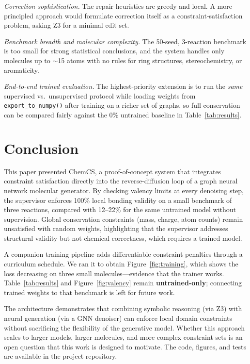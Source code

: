 \documentclass[11pt]{article}
\begin{document}
\emph{Correction sophistication.} The repair heuristics are greedy and
local. A more principled approach would formulate correction itself as
a constraint-satisfaction problem, asking Z3 for a minimal edit set.

\emph{Benchmark breadth and molecular complexity.} The 50-seed,
3-reaction benchmark is too small for strong statistical conclusions,
and the system handles only molecules up to $\sim$15 atoms with no
rules for ring structures, stereochemistry, or aromaticity.

\emph{End-to-end trained evaluation.} The highest-priority extension is
to run the \emph{same} supervised vs.\ unsupervised protocol while loading
weights from \texttt{export\_to\_numpy()} after training on a richer set
of graphs, so full conservation can be compared fairly against the
0\% untrained baseline in Table~\ref{tab:results}.

\section{Conclusion}

This paper presented ChemCS, a proof-of-concept system that integrates
constraint satisfaction directly into the reverse-diffusion loop of a
graph neural network molecular generator. By checking valency limits at
every denoising step, the supervisor enforces 100\% local bonding
validity on a small benchmark of three reactions, compared with
12--22\% for the same untrained model without supervision. Global
conservation constraints (mass, charge, atom counts) remain unsatisfied
with random weights, highlighting that the supervisor addresses
structural validity but not chemical correctness, which requires a
trained model.

A companion training pipeline adds differentiable constraint penalties
through a curriculum schedule. We ran it to obtain Figure~\ref{fig:training},
which shows the loss decreasing on three small molecules---evidence that
the trainer works. Table~\ref{tab:results} and Figure~\ref{fig:valency}
remain \textbf{untrained-only}; connecting trained weights to that
benchmark is left for future work.

The architecture demonstrates that combining symbolic reasoning (via Z3)
with neural generation (via a GNN denoiser) can enforce local domain
constraints without sacrificing the flexibility of the generative model.
Whether this approach scales to larger models, larger molecules, and
more complex constraint sets is an open question that this work is
designed to motivate. The code, figures, and tests are available in the
project repository.
\end{document}
